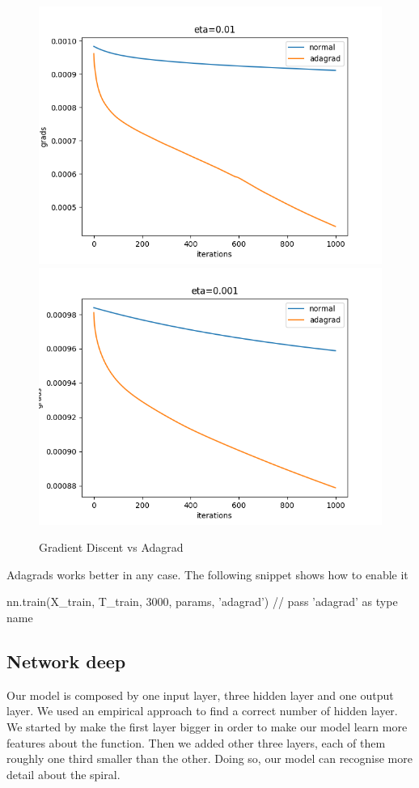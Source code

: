 \documentclass[11pt]{article}
\begin{document}
\begin{figure}[H]
\includegraphics[scale=0.5]{images/adagrad/adagrad_plot_2.png}	
\includegraphics[scale=0.5]{images/adagrad/adagrad_plot_3.png}	
\caption{Gradient Discent vs Adagrad}
\label{fig: adagrad}
\end{figure}
Adagrads works better in any case.
The following snippet shows how to enable it
\begin{python}
nn.train(X_train, T_train, 3000, params, 'adagrad') // pass 'adagrad' as type name
\end{python}

\subsection{Network deep}
Our model is composed by one input layer, three hidden layer and one output layer. We used an empirical approach to find a correct number of hidden layer. We started by make the first layer bigger in order to make our model learn more features about the function. Then we added other three layers, each of them roughly one third smaller than the other. Doing so, our model can recognise more detail about the spiral.
\end{document}
